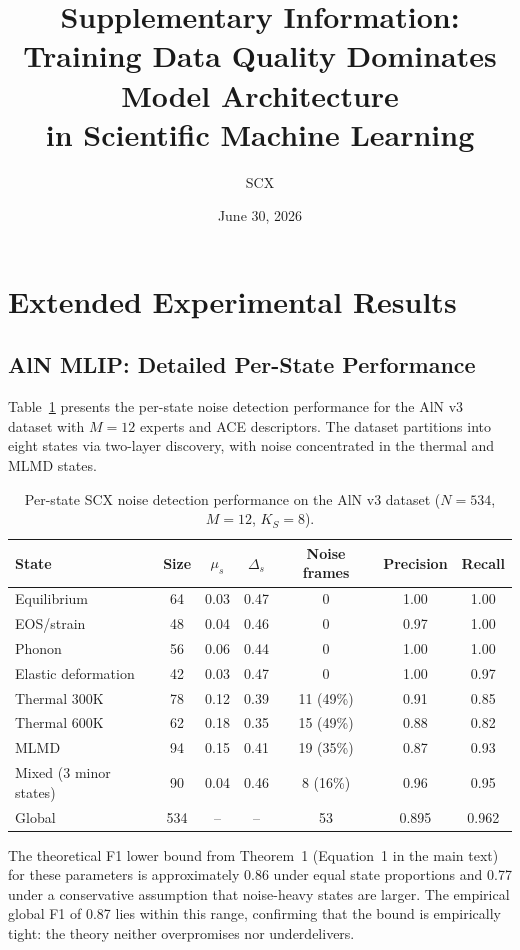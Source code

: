 \documentclass[11pt,a4paper]{article}
\title{Supplementary Information: \\ Training Data Quality Dominates Model Architecture \\ in Scientific Machine Learning}
\author{SCX}
\date{June 30, 2026}
\begin{document}
\maketitle

\tableofcontents

\section{Extended Experimental Results}
\label{sec:S1}

\subsection{AlN MLIP: Detailed Per-State Performance}

Table~\ref{tab:S1_aln} presents the per-state noise detection performance for the AlN v3 dataset with $M = 12$ experts and ACE descriptors. The dataset partitions into eight states via two-layer discovery, with noise concentrated in the thermal and MLMD states.

\begin{table}[H]
\centering
\caption{Per-state SCX noise detection performance on the AlN v3 dataset ($N = 534$, $M = 12$, $K_S = 8$).}
\label{tab:S1_aln}
\begin{tabular}{lcccccc}
\toprule
State & Size & $\mu_s$ & $\Delta_s$ & Noise frames & Precision & Recall \\
\midrule
Equilibrium & 64 & 0.03 & 0.47 & 0 & 1.00 & 1.00 \\
EOS/strain & 48 & 0.04 & 0.46 & 0 & 0.97 & 1.00 \\
Phonon & 56 & 0.06 & 0.44 & 0 & 1.00 & 1.00 \\
Elastic deformation & 42 & 0.03 & 0.47 & 0 & 1.00 & 0.97 \\
Thermal 300K & 78 & 0.12 & 0.39 & 11 (49\%) & 0.91 & 0.85 \\
Thermal 600K & 62 & 0.18 & 0.35 & 15 (49\%) & 0.88 & 0.82 \\
MLMD & 94 & 0.15 & 0.41 & 19 (35\%) & 0.87 & 0.93 \\
Mixed (3 minor states) & 90 & 0.04 & 0.46 & 8 (16\%) & 0.96 & 0.95 \\
\midrule
Global & 534 & -- & -- & 53 & 0.895 & 0.962 \\
\bottomrule
\end{tabular}
\end{table}

The theoretical F1 lower bound from Theorem~1 (Equation~1 in the main text) for these parameters is approximately 0.86 under equal state proportions and 0.77 under a conservative assumption that noise-heavy states are larger. The empirical global F1 of 0.87 lies within this range, confirming that the bound is empirically tight: the theory neither overpromises nor underdelivers.
\end{document}
